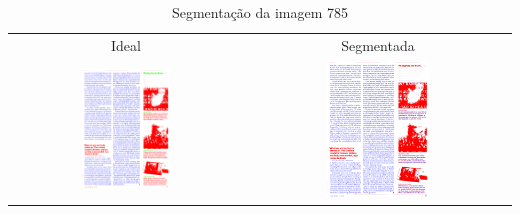 \documentclass[a4paper,11pt]{article}
\begin{document}
    \begin{table}[p]
      \caption{Segmentação da imagem 785}
      \begin{center}
        \begin{tabular}{ c c }
          Ideal & Segmentada \\
          \includegraphics[width=0.4\textwidth]{assets/final_ideal/time_785_ideal.png}
          &
          \includegraphics[width=0.4\textwidth]{assets/result_imagens/time_50_percent_sparse_9x9_785_final.png}
        \end{tabular}
      \end{center}
      \label{tab:segmentation_785}
    \end{table}
\end{document}
